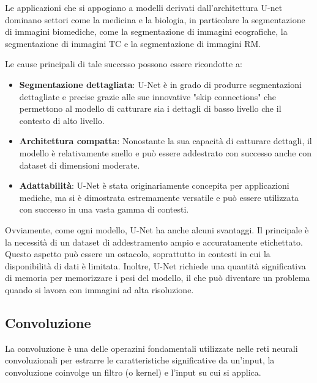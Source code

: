 Le applicazioni che si appogiano a modelli derivati dall'architettura U-net dominano settori come la medicina e la biologia, in particolare la segmentazione di immagini biomediche, come la segmentazione di immagini ecografiche, la segmentazione di immagini TC e la segmentazione di immagini RM.

Le cause principali di tale successo possono essere ricondotte a:
\begin{itemize}
  \item \textbf{Segmentazione dettagliata}: U-Net è in grado di produrre segmentazioni dettagliate e precise grazie alle sue innovative "skip connections" che permettono al modello di catturare sia i dettagli di basso livello che il contesto di alto livello.
  \item \textbf{Architettura compatta}: Nonostante la sua capacità di catturare dettagli, il modello è relativamente snello e può essere addestrato con successo anche con dataset di dimensioni moderate.
  \item \textbf{Adattabilità}: U-Net è stata originariamente concepita per applicazioni mediche, ma si è dimostrata estremamente versatile e può essere utilizzata con successo in una vasta gamma di contesti.
\end{itemize}

Ovviamente, come ogni modello, U-Net ha anche alcuni svantaggi. Il principale è la necessità di un dataset di addestramento ampio e accuratamente etichettato. Questo aspetto può essere un ostacolo, soprattutto in contesti in cui la disponibilità di dati è limitata. Inoltre, U-Net richiede una quantità significativa di memoria per memorizzare i pesi del modello, il che può diventare un problema quando si lavora con immagini ad alta risoluzione.


\subsection{Convoluzione} %
\label{sec:convoluzione}


La convoluzione è una delle operazini fondamentali utilizzate nelle reti neurali convoluzionali per estrarre le caratteristiche significative da un'input, la convoluzione coinvolge un filtro (o kernel) e l'input su cui si applica.

